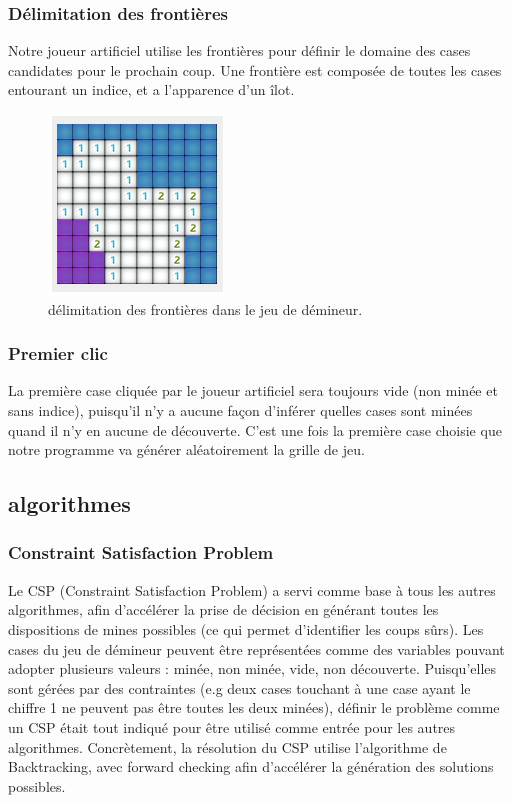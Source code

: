 \documentclass{article}
\begin{document}
\subsubsection{Délimitation des frontières}
Notre joueur artificiel utilise les frontières pour définir 
le domaine des cases candidates pour le prochain coup. Une frontière est 
composée de toutes les cases entourant un indice, et a l’apparence d’un îlot.
                \begin{figure}[h!]
			\caption {délimitation des frontières dans le jeu de démineur.}
                \centering
                \includegraphics[scale=.5]{./demineur_2.png}
                \end{figure}

\subsubsection{Premier clic}
La première case cliquée par le joueur artificiel sera 
toujours vide (non minée et sans indice), puisqu’il n’y a aucune façon 
d’inférer quelles cases sont minées quand il n’y en aucune de 
découverte. C'est une fois la première case choisie que notre programme va générer aléatoirement la grille de jeu.

\subsection{algorithmes}
\subsubsection{Constraint Satisfaction Problem}
Le CSP (Constraint Satisfaction Problem) a servi comme base à tous 
les autres algorithmes, afin d’accélérer la prise de décision en générant 
toutes les dispositions de mines possibles (ce qui permet d’identifier les coups sûrs). 
Les cases du jeu de démineur peuvent être représentées comme des variables pouvant adopter 
plusieurs valeurs : minée, non minée, vide, non découverte. Puisqu’elles sont gérées 
par des contraintes (e.g deux cases touchant à une case ayant le chiffre 1 ne peuvent 
pas être toutes les deux minées), définir le problème comme un CSP était tout indiqué pour être utilisé comme entrée pour les autres algorithmes.
Concrètement, la résolution du CSP utilise l'algorithme de Backtracking, avec forward checking afin d’accélérer la génération 
des solutions possibles.
\end{document}
